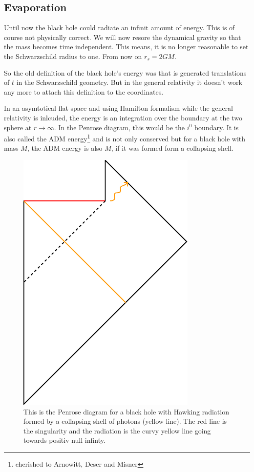 \subsection{Evaporation \checkmark}
	Until now the black hole could radiate an infinit amount of energy. This is of course not physically correct. We will now resore the dynamical gravity so that the mass becomes time independent. This means, it is no longer reasonable to set the Schwarzschild radius to one. From now on $r_s= 2GM$.	
	
	So the old definition of the black hole's energy was that is generated translations of $t$ in the Schwarzschild geometry. But in the general relativity it doesn't work any more to attach this definition to the coordinates.
	
	In an asymtotical flat space and using Hamilton formalism while the general relativity is inlcuded, the energy is an integration over the boundary at the two sphere at $r\rightarrow \infty$. In the Penrose diagram, this would be the $i^0$ boundary. It is also called the ADM energy\footnote{cherished to Arnowitt, Deser and Misner} and is not only conserved but for a black hole with mass $M$, the ADM energy is also $M$, if it was formed form a collapsing shell. 
	
	\begin{figure} [t]
		\begin{center}
			\includegraphics[scale=0.7]{evappen}
			\caption{This is the Penrose diagram for a black hole with Hawking radiation formed by a collapsing shell of photons (yellow line). The red line is the singularity and the radiation is the curvy yellow line going towards positiv null infinty.} \label{penrose_hawking}
		\end{center}
	\end{figure}
		
